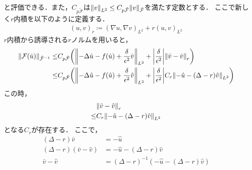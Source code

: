 と評価できる．また，\(C_{p\tilde{\mathcal{F}}}\)は\(\norm{v}_{L^2}\leq C_{p\tilde{\mathcal{F}}}\norm{v}_{\tilde{\mathcal{F}}}\)を満たす定数とする．
ここで新しく\(r\)内積を以下のように定義する．
\begin{align}
   (u,v)_r \coloneqq (\nabla u,\nabla v)_{L^2}+r(u,v)_{L^2}
\end{align}
\(r\)内積から誘導される\(r\)ノルムを用いると，
\begin{align}
   \norm{\mathcal{F}\qty(\hat{u})}_{\tilde{\mathcal{F}}^{-1}}
   \leq&
   C_{p\tilde{\mathcal{F}}}\qty(\norm{-\Delta \hat{u}-f(\hat{u})+\dfrac{\delta}{\epsilon^2}\hat{v}}_{L^2}+\qty|\dfrac{\delta}{\epsilon^2}|\norm{\bar{v}-\hat{v}}_{r})\\
   \leq&
   C_{p\tilde{\mathcal{F}}}\qty(\norm{-\Delta \hat{u}-f(\hat{u})+\dfrac{\delta}{\epsilon^2}\hat{v}}_{L^2}+\qty|\dfrac{\delta}{\epsilon^2}|C_r\norm{-\hat{u}-(\Delta-r)\hat{v}}_{L^2})\\
\end{align}
この時，
\begin{align}
   &\norm{\bar{v}-\hat{v}}_r\\
   \leq&C_r\norm{-\hat{u}-(\Delta-r)\hat{v}}_{L^2}
\end{align}
となる\(C_r\)が存在する．
ここで，
\begin{align}
   (\Delta-r)\bar{v}&=-\hat{u}\\
   (\Delta-r)(\bar{v}-\hat{v})&=-\hat{u}-(\Delta-r)\hat{v}\\
   \bar{v}-\hat{v}&=(\Delta-r)^{-1}(-\hat{u}-(\Delta-r)\hat{v})
\end{align}
